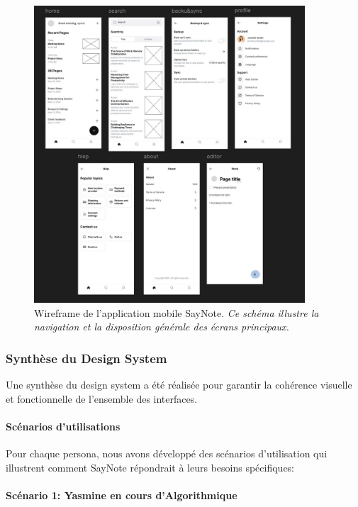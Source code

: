     \begin{figure}[H]
        \centering
        \includegraphics[width=0.9\textwidth]{assets/docs/mobile/wireframe_app-2.jpg}
        \caption{Wireframe de l'application mobile SayNote. \newline\textit{Ce schéma illustre la navigation et la disposition générale des écrans principaux.}}
        \label{fig:wireframe_app_main}
    \end{figure}
    
    
    \subsubsection{Synthèse du Design System}
    
    Une synthèse du design system a été réalisée pour garantir la cohérence visuelle et fonctionnelle de l'ensemble des interfaces.
    
        
    \paragraph{Scénarios d'utilisations}
    
    Pour chaque persona, nous avons développé des scénarios d'utilisation qui illustrent comment SayNote répondrait à leurs besoins spécifiques:
    
    \paragraph{Scénario 1: Yasmine en cours d'Algorithmique}
    
